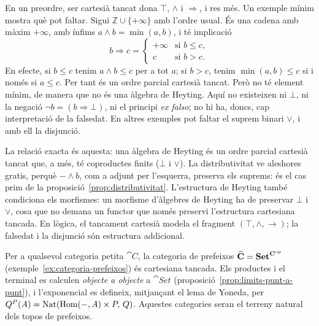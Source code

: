 \begin{observacio}\label{obs:ccc-no-heyting}
En un preordre, ser cartesià tancat dona $\top$, $\wedge$ i $\Rightarrow$, i res més. Un exemple mínim mostra què pot faltar. Sigui $\mathbb Z\cup\{+\infty\}$ amb l'ordre usual. És una cadena amb màxim $+\infty$, amb ínfims $a\wedge b=\min(a,b)$, i té implicació
\[
b\Rightarrow c=\begin{cases}+\infty&\text{si } b\leq c,\\ c&\text{si } b>c.\end{cases}
\]
En efecte, si $b\leq c$ tenim $a\wedge b\leq c$ per a tot $a$; si $b>c$, tenim $\min(a,b)\leq c$ si i només si $a\leq c$. Per tant és un ordre parcial cartesià tancat. Però no té element mínim, de manera que no és una àlgebra de Heyting. Aquí no existeixen ni $\bot$, ni la negació $\neg b=(b\Rightarrow\bot)$, ni el principi \emph{ex falso}; no hi ha, doncs, cap interpretació de la falsedat. En altres exemples pot faltar el suprem binari $\vee$, i amb ell la disjunció.

La relació exacta és aquesta: una àlgebra de Heyting és un ordre parcial cartesià tancat que, a més, té coproductes finits ($\bot$ i $\vee$). La distributivitat ve aleshores gratis, perquè $-\wedge b$, com a adjunt per l'esquerra, preserva els suprems: és el cas prim de la proposició~\ref{prop:distributivitat}. L'estructura de Heyting també condiciona els morfismes: un morfisme d'àlgebres de Heyting ha de preservar $\bot$ i $\vee$, cosa que no demana un functor que només preservi l'estructura cartesiana tancada. En lògica, el tancament cartesià modela el fragment $(\top,\wedge,\to)$; la falsedat i la disjunció són estructura addicional.
\end{observacio}

\begin{exemple}
Per a qualsevol categoria petita $\cat{C}$, la categoria de prefeixos $\widehat{\mathbf{C}}=\mathbf{Set}^{\mathbf{C}^{\mathrm{op}}}$ (exemple~\ref{ex:categoria-prefeixos}) és cartesiana tancada. Els productes i el terminal es calculen \emph{objecte a objecte} a $\cat{Set}$ (proposició~\ref{prop:limits-punt-a-punt}), i l'exponencial es defineix, mitjançant el lema de Yoneda, per $Q^{P}(A)=\operatorname{Nat}(\operatorname{Hom}(-,A)\times P,\,Q)$. Aquestes categories seran el terreny natural dels topos de prefeixos.
\end{exemple}

